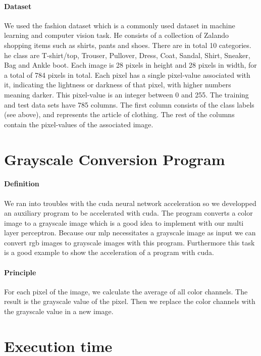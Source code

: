 \documentclass[11pt]{article}
\begin{document}
\paragraph*{Dataset} We used the fashion dataset which is a commonly used dataset in machine learning and computer vision task.
He consists of a collection of Zalando shopping items such as shirts, pants and shoes. There are in total 10 categories.
he class are T-shirt/top, Trouser, Pullover, Dress, Coat, Sandal, Shirt, Sneaker, Bag and Ankle boot.
Each image is 28 pixels in height and 28 pixels in width, for a total of 784 pixels in total.
Each pixel has a single pixel-value associated with it, indicating the lightness or darkness of that pixel, with higher numbers meaning darker.
This pixel-value is an integer between 0 and 255. The training and test data sets have 785 columns.
The first column consists of the class labels (see above), and represents the article of clothing.
The rest of the columns contain the pixel-values of the associated image.

\section{Grayscale Conversion Program}

\paragraph*{Definition} We ran into troubles with the cuda neural network acceleration so we developped an auxiliary program to be accelerated with cuda.
The program converts a color image to a grayscale image which is a good idea to implement with our multi layer perceptron.
Because our mlp necessitates a grayscale image as input we can convert rgb images to grayscale images with this program.
Furthermore this task is a good example to show the acceleration of a program with cuda.

\paragraph*{Principle} For each pixel of the image, we calculate the average of all color channels.
The result is the grayscale value of the pixel. Then we replace the color channels with the grayscale value in a new image.

\pagebreak


\section{Execution time}
\end{document}
